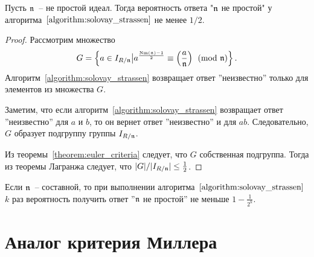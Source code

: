 \documentclass[_00_dissertation.tex]{subfiles}
\begin{document}
\begin{proposition}
    Пусть $\mathfrak{n}$~-- не простой идеал.
    Тогда вероятность ответа "$\mathfrak{n}$ не простой" у алгоритма~$\ref{algorithm:solovay_strassen}$ не менее $1/2$.
\end{proposition}
\begin{proof}
    Рассмотрим множество
    \begin{equation*}
        G = \left\{
            a \in I_{R/\mathfrak{n}} \big| a^{\frac{\textrm{Nm}(\mathfrak{n}) - 1}{2}} \equiv \left(\frac{a}{\mathfrak{n}}\right) \pmod{\mathfrak{n}}
        \right\}.
    \end{equation*}
    Алгоритм~\ref{algorithm:solovay_strassen} возвращает ответ ''неизвестно'' только для элементов из множества $G$.

    Заметим, что если алгоритм~\ref{algorithm:solovay_strassen} возвращает ответ ''неизвестно'' для $a$ и $b$, то он вернет ответ ''неизвестно'' и для $a b$.
    Следовательно, $G$ образует подгруппу группы $I_{R/\mathfrak{n}}$.

    Из теоремы~\ref{theorem:euler_criteria} следует, что $G$ собственная подгруппа.
    Тогда из теоремы Лагранжа следует, что $|G|/|I_{R/\mathfrak{n}}| \le \frac{1}{2}$.
\end{proof}

\begin{remark}
    Если $\mathfrak{n}$~-- составной, то при выполнении алгоритма~$\ref{algorithm:solovay_strassen}$ $k$ раз вероятность получить ответ ''$\mathfrak{n}$ не простой'' не меньше $1 - \frac{1}{2^k}$.
\end{remark}

\section{Аналог критерия Миллера}
\end{document}

